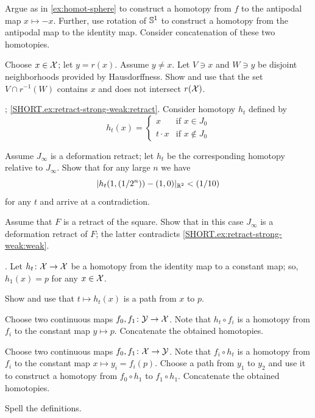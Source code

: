 Argue as in \ref{ex:homot-sphere} to construct a homotopy from $f$ to the antipodal map $x\mapsto -x$.
Further, use rotation of $\mathbb{S}^1$ to construct a homotopy from the antipodal map to the identity map.
Consider concatenation of these two homotopies.

Choose $x\in \mathcal{X}$; let $y=r(x)$.
Assume $y\ne x$.
Let $V\ni x$ and $W\ni y$ be disjoint neighborhoods provided by Hausdorffness.
Show and use that the set $V\cap r^{-1}(W)$ contains $x$ and does not intersect $r(\mathcal{X})$.

\parbf{\ref{ex:retract-strong-weak}};
\ref{SHORT.ex:retract-strong-weak:retract}.
Consider homotopy $h_t$ defined by
\[h_t(x)=
\begin{cases}
x&\text{if\ }x\in J_0
\\
t\cdot x&\text{if\ }x\notin J_0
\end{cases}
\]

Assume $J_\infty$ is a deformation retract;
let $h_t$ be the corresponding homotopy relative to $J_\infty$.
Show that for any large $n$ we have
\[|h_t(1,(1/2^n))-(1,0)|_{\mathbb{R}^2}<(1/10)\] for any $t$
and arrive at a contradiction.

Assume that $F$ is a retract of the square.
Show that in this case $J_\infty$ is a deformation retract of $F$;
the latter contradicts \ref{SHORT.ex:retract-strong-weak:weak}.


\parbf{\ref{ex:contractible}}.
Let $h_t\colon\mathcal{X}\to \mathcal{X}$ be a homotopy from the identity map to a constant map;
so, $h_1(x)=p$ for any $x\in \mathcal{X}$.

Show and use that $t\mapsto h_t(x)$ is a path from $x$ to $p$.

Choose two continuous maps $f_0, f_1\:\c{Y}\z\to \c{X}$.
Note that $h_t\circ f_i$ is a homotopy from $f_i$ to the constant map $y\mapsto p$.
Concatenate the obtained homotopies.

Choose two continuous maps $f_0, f_1\:\c{X}\z\to \c{Y}$.
Note that $f_i\circ h_t$ is a homotopy from $f_i$ to the constant map $x\mapsto y_i=f_i(p)$.
Choose a path from $y_1$ to $y_2$ and use it to construct a homotopy from $f_0\circ h_1$ to $f_1\circ h_1$.
Concatenate the obtained homotopies.

Spell the definitions.

